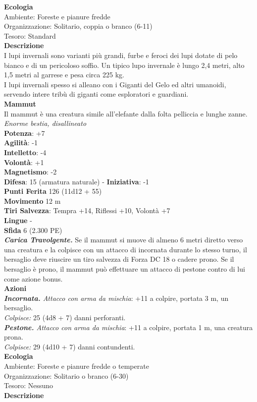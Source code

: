 \begin{multicols}{2}
\textbf{Ecologia}\\
Ambiente: Foreste e pianure fredde\\
Organizzazione: Solitario, coppia o branco (6-11)\\
Tesoro: Standard\\
\textbf{Descrizione}\\
I lupi invernali sono varianti più grandi, furbe e feroci dei lupi dotate di pelo bianco e di un pericoloso soffio. Un tipico lupo invernale è lungo 2,4 metri, alto 1,5 metri al garrese e pesa circa 225 kg.\\
I lupi invernali spesso si alleano con i Giganti del Gelo ed altri umanoidi, servendo intere tribù di giganti come esploratori e guardiani.\\

\medskip\textbf{Mammut}\\
Il mammut è una creatura simile all'elefante dalla folta pelliccia e lunghe zanne.\\
\emph{Enorme bestia, disallineato}\\
\textbf{Potenza}: +7\\
\textbf{Agilità}: -1\\
\textbf{Intelletto}: -4\\
\textbf{Volontà}: +1\\
\textbf{Magnetismo}: -2\\
\textbf{Difesa}: 15 (armatura naturale) - \textbf{Iniziativa}: -1\\
\textbf{Punti Ferita} 126 (11d12 + 55)\\
\textbf{Movimento} 12 m\\
\textbf{Tiri Salvezza}: Tempra +14, Riflessi +10, Volontà +7 \\
\textbf{Lingue} -\\
\textbf{Sfida} 6 (2.300 PE)\smallskip\\
\emph{\textbf{Carica Travolgente.}} Se il mammut si muove di almeno 6 metri diretto verso una creatura e la colpisce con un attacco di incornata durante lo stesso turno, il bersaglio deve riuscire un tiro salvezza di Forza DC 18 o cadere prono. Se il bersaglio è prono, il mammut può effettuare un attacco di pestone contro di lui come azione bonus.\\
\smallskip\textbf{Azioni}\\
\emph{\textbf{Incornata.} Attacco con arma da mischia}: +11 a colpire, portata 3 m, un bersaglio.\\
\emph{Colpisce:} 25 (4d8 + 7) danni perforanti.\\
\emph{\textbf{Pestone.} Attacco con arma da mischia}: +11 a colpire, portata 1 m, una creatura prona.\\
\emph{Colpisce:} 29 (4d10 + 7) danni contundenti.\\
\textbf{Ecologia}\\
Ambiente: Foreste e pianure fredde o temperate\\
Organizzazione: Solitario o branco (6-30)\\
Tesoro: Nessuno\\
\textbf{Descrizione}\\


\end{multicols}
